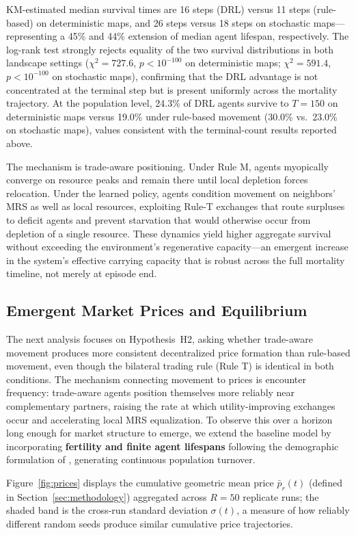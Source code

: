 \documentclass[pdflatex,sn-mathphys-num]{sn-jnl}%
\theoremstyle{thmstyleone}%
\theoremstyle{thmstyletwo}%
\theoremstyle{thmstylethree}%
\begin{document}
KM-estimated median survival times are 16 steps (DRL) versus 11 steps (rule-based) on deterministic maps, and 26 steps versus 18 steps on stochastic maps---representing a 45\% and 44\% extension of median agent lifespan, respectively.
The log-rank test strongly rejects equality of the two survival distributions in both landscape settings ($\chi^2 = 727.6$, $p < 10^{-100}$ on deterministic maps; $\chi^2 = 591.4$, $p < 10^{-100}$ on stochastic maps), confirming that the DRL advantage is not concentrated at the terminal step but is present uniformly across the mortality trajectory.
At the population level, 24.3\% of DRL agents survive to $T = 150$ on deterministic maps versus 19.0\% under rule-based movement (30.0\% vs.\ 23.0\% on stochastic maps), values consistent with the terminal-count results reported above.

The mechanism is trade-aware positioning.
Under Rule M, agents myopically converge on resource peaks and remain there until local depletion forces relocation.
Under the learned policy, agents condition movement on neighbors' MRS as well as local resources, exploiting Rule-T exchanges that route surpluses to deficit agents and prevent starvation that would otherwise occur from depletion of a single resource.
These dynamics yield higher aggregate survival without exceeding the environment's regenerative capacity---an emergent increase in the system's effective carrying capacity that is robust across the full mortality timeline, not merely at episode end.

\subsection{Emergent Market Prices and Equilibrium}
The next analysis focuses on Hypothesis~H2, asking whether trade-aware movement produces more consistent decentralized price formation than rule-based movement, even though the bilateral trading rule (Rule T) is identical in both conditions.  
The mechanism connecting movement to prices is encounter frequency: trade-aware agents position themselves more reliably near complementary partners, raising the rate at which utility-improving exchanges occur and accelerating local MRS equalization.  
To observe this over a horizon long enough for market structure to emerge, we extend the baseline model by incorporating \textbf{fertility and finite agent lifespans} following the demographic formulation of \citet{EpsteinAxtell1996}, generating continuous population turnover.

Figure~\ref{fig:prices} displays the cumulative geometric mean price $\bar{p}_r(t)$ (defined in Section~\ref{sec:methodology}) aggregated across $R = 50$ replicate runs; the shaded band is the cross-run standard deviation $\sigma(t)$, a measure of how reliably different random seeds produce similar cumulative price trajectories.
\end{document}
